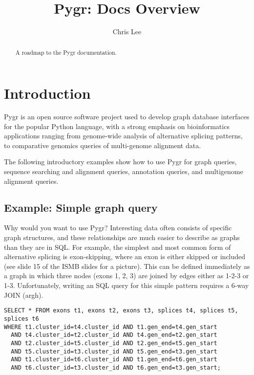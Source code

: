 \documentclass{howto}
\title{Pygr: Docs Overview}
\author{Chris Lee}
\begin{document}
\maketitle

\begin{abstract}
  \noindent
   A roadmap to the Pygr documentation.
\end{abstract}



%
\tableofcontents


\section{Introduction}
\label{intro}

Pygr is an open source software project used to develop graph database
interfaces for the popular Python language, with a strong emphasis
on bioinformatics applications ranging from genome-wide analysis of
alternative splicing patterns, to comparative genomics queries of
multi-genome alignment data.

The following introductory examples show how to use Pygr for graph queries, sequence searching and alignment queries, annotation queries, and multigenome alignment queries.


\subsection{Example: Simple graph query}
Why would you want to use Pygr?  Interesting data often consists of specific graph structures, and these relationships are much easier to describe as graphs than they are in SQL.  For example, the simplest and most common form of alternative splicing is exon-skipping, where an exon is either skipped or included (see slide 15 of the ISMB slides for a picture).  This can be defined immediately as a graph in which three nodes (exons 1, 2, 3) are joined by edges either as 1-2-3 or 1-3.  Unfortunately, writing an SQL query for this simple pattern requires a 6-way JOIN (argh).

\begin{verbatim}
SELECT * FROM exons t1, exons t2, exons t3, splices t4, splices t5, splices t6 
WHERE t1.cluster_id=t4.cluster_id AND t1.gen_end=t4.gen_start 
  AND t4.cluster_id=t2.cluster_id AND t4.gen_end=t2.gen_start 
  AND t2.cluster_id=t5.cluster_id AND t2.gen_end=t5.gen_start 
  AND t5.cluster_id=t3.cluster_id AND t5.gen_end=t3.gen_start 
  AND t1.cluster_id=t6.cluster_id AND t1.gen_end=t6.gen_start 
  AND t6.cluster_id=t3.cluster_id AND t6.gen_end=t3.gen_start;
\end{verbatim}
\end{document}
